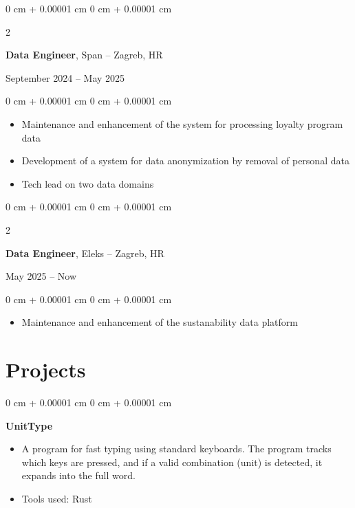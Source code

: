 \documentclass[10pt, letterpaper]{article}
\newenvironment{highlights}{
    \begin{itemize}[
        topsep=0.10 cm,
        parsep=0.10 cm,
        partopsep=0pt,
        itemsep=0pt,
        leftmargin=0 cm + 10pt
    ]
}{
    \end{itemize}
} %
\newenvironment{onecolentry}{
    \begin{adjustwidth}{
        0 cm + 0.00001 cm
    }{
        0 cm + 0.00001 cm
    }
}{
    \end{adjustwidth}
} %
\newenvironment{twocolentry}[2][]{
    \onecolentry
    \def\secondColumn{#2}
    \setcolumnwidth{\fill, 4.5 cm}
    \begin{paracol}{2}
}{
    \switchcolumn \raggedleft \secondColumn
    \end{paracol}
    \endonecolentry
} %
\begin{document}
        \vspace{0.2 cm}

        \begin{twocolentry}{
            September 2024 – May 2025
        }
            \textbf{Data Engineer}, Span -- Zagreb, HR
        \end{twocolentry}

        \vspace{0.10 cm}
        \begin{onecolentry}
            \begin{highlights}
                \item Maintenance and enhancement of the system for processing loyalty program data
                \item Development of a system for data anonymization by removal of personal data
                \item Tech lead on two data domains
            \end{highlights}
        \end{onecolentry}


        \begin{twocolentry}{
            May 2025 – Now
        }
            \textbf{Data Engineer}, Eleks -- Zagreb, HR
        \end{twocolentry}

        \vspace{0.10 cm}
        \begin{onecolentry}
            \begin{highlights}
                \item Maintenance and enhancement of the sustanability data platform
            \end{highlights}
        \end{onecolentry}


    \section{Projects}

        \begin{onecolentry}
            \textbf{UnitType}
            \vspace{0.10 cm}
            \begin{highlights}
                \item A program for fast typing using standard keyboards. The program tracks which keys are pressed, and if a valid combination (unit) is detected, it expands into the full word.
                \item Tools used: Rust
            \end{highlights}
        \end{onecolentry}
\end{document}
